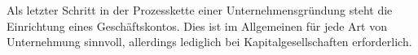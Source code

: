 
Als letzter Schritt in der Prozesskette einer Unternehmensgründung steht die Einrichtung eines Geschäftskontos. Dies ist im Allgemeinen
für jede Art von Unternehmung sinnvoll, allerdings lediglich bei Kapitalgesellschaften erforderlich.